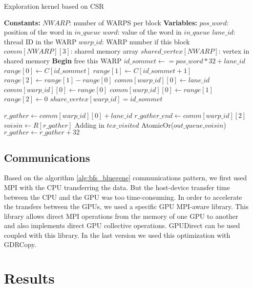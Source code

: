 \begin{algorithm}
\caption{Exploration kernel based on CSR}\label{alg:csr}
\begin{algorithmic}[1]
\State \textbf{Constants:}
\State $NWARP$: number of WARPS per block
\State 
\State \textbf{Variables:}
\State $pos\_word$: position of the word in $in\_queue$
\State $word$: value of the word in $in\_queue$
\State $lane\_id$: thread ID in the WARP
\State $warp\_id$: WARP number if this block
\State $comm[NWARP][3]$: shared memory array
\State $shared\_vertex[NWARP]$: vertex in shared memory
\State 
\State \textbf{Begin}
\State free this WARP
\EndIf
{}
\State $id\_sommet \gets = pos\_word*32+lane\_id$
\State $range[0] \gets C[id\_sommet]$ 
\State $range[1] \gets C[id\_sommet +1 ]$ 
\State $range[2] \gets range[1] - range[0]$ 
\EndIf
{}
\State $comm[warp\_id][0] \gets lane\_id$
\EndIf
{}
\State $comm[warp\_id][0] \gets range[0]$
\State $comm[warp\_id][0] \gets range[1]$
\State $range[2] \gets 0$
\State $share\_vertex[warp\_id] = id\_sommet$ 
\EndIf

\State $r\_gather \gets comm[warp\_id][0] + lane\_id$
\State $r\_gather\_end \gets comm[warp\_id][2] $
	\State $voisin \gets R[r\_gather]$
		\State Adding in $tex\_visited$
		\State AtomicOr($out\_queue$,$voisin$)
	\EndIf
	\State $r\_gather \gets r\_gather + 32$
\EndWhile
\EndWhile
\end{algorithmic}
\end{algorithm}

 
\subsection{Communications}

Based on the algorithm \ref{alg:bfs_bluegene} communications pattern, we first used MPI with the CPU transferring the data. But the host-device transfer time between the CPU and the GPU was too time-consuming. 
In order to accelerate the transfers between the GPUs, we used a specific GPU MPI-aware  library. This library allows direct MPI operations from the memory of one GPU to another and also implements direct GPU collective operations. 
GPUDirect can be used coupled with this library. In the last version we used this optimization with GDRCopy. 

\section{Results}

